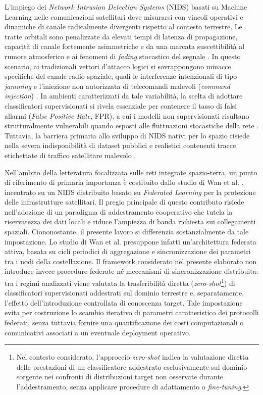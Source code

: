 L'impiego dei \textit{Network Intrusion Detection Systems} (NIDS) basati su Machine Learning nelle comunicazioni satellitari deve misurarsi con vincoli operativi e dinamiche di canale radicalmente divergenti rispetto al contesto terrestre. 
Le tratte orbitali sono penalizzate da elevati tempi di latenza di propagazione, capacità di canale fortemente asimmetriche e da una marcata suscettibilità al rumore atmosferico e ai fenomeni di \textit{fading} stocastico del segnale \cite{kodheli2021}. 
In questo scenario, ai tradizionali vettori d'attacco logici si sovrappongono minacce specifiche del canale radio spaziale, quali le interferenze intenzionali di tipo \textit{jamming} e l'iniezione non autorizzata di telecomandi malevoli (\textit{command injection}) \cite{nist2022}. 
In ambienti caratterizzati da tale variabilità, la scelta di adottare classificatori supervisionati si rivela essenziale per contenere il tasso di falsi allarmi (\textit{False Positive Rate}, FPR), a cui i modelli non supervisionati risultano strutturalmente vulnerabili quando esposti alle fluttuazioni stocastiche della rete \cite{khraisat2019, kodheli2021}. 
Tuttavia, la barriera primaria allo sviluppo di NIDS nativi per lo spazio risiede nella severa indisponibilità di dataset pubblici e realistici contenenti tracce etichettate di traffico satellitare malevolo \cite{azar2023}.

Nell'ambito della letteratura focalizzata sulle reti integrate spazio-terra, un punto di riferimento di primaria importanza è costituito dallo studio di Wan et al. \cite{wan2025}, incentrato su un NIDS distribuito basato su \textit{Federated Learning} per la protezione delle infrastrutture satellitari. 
Il pregio principale di questo contributo risiede nell'adozione di un paradigma di addestramento cooperativo che tutela la riservatezza dei dati locali e riduce l'ampiezza di banda richiesta sui collegamenti spaziali. 
Ciononostante, il presente lavoro si differenzia sostanzialmente da tale impostazione. 
Lo studio di Wan et al. presuppone infatti un'architettura federata attiva, basata su cicli periodici di aggregazione e sincronizzazione dei parametri tra i nodi della costellazione. 
Il framework considerato nel presente elaborato non introduce invece procedure federate né meccanismi di sincronizzazione distribuita: tra i regimi analizzati viene valutata la trasferibilità diretta (\textit{zero-shot}\footnote{Nel contesto considerato, l'approccio \textit{zero-shot} indica la valutazione diretta delle prestazioni di un classificatore addestrato esclusivamente sul dominio sorgente nei confronti di distribuzioni target non osservate durante l'addestramento, senza applicare procedure di adattamento o \textit{fine-tuning}.}) di classificatori supervisionati addestrati sul dominio terrestre e, separatamente, l'effetto dell'introduzione controllata di conoscenza target. 
Tale impostazione evita per costruzione lo scambio iterativo di parametri caratteristico dei protocolli federati, senza tuttavia fornire una quantificazione dei costi computazionali o comunicativi associati a un eventuale deployment operativo. 

